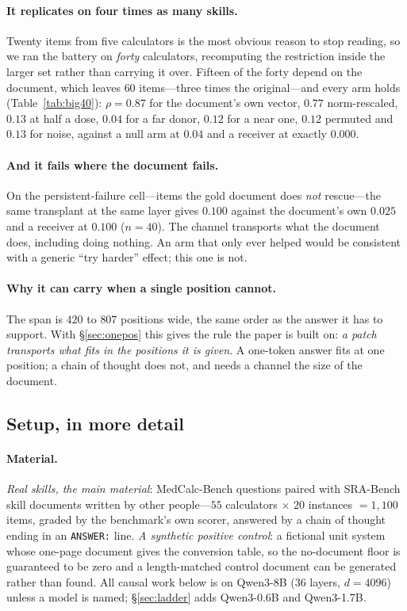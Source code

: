 \documentclass{article}
\begin{document}
\paragraph{It replicates on four times as many skills.} Twenty items from five
calculators is the most obvious reason to stop reading, so we ran the battery on
\emph{forty} calculators, recomputing the restriction inside the larger set
rather than carrying it over. Fifteen of the forty depend on the document, which
leaves $60$ items---three times the original---and every arm holds
(Table~\ref{tab:big40}): $\rho = 0.87$ for the document's own vector, $0.77$
norm-rescaled, $0.13$ at half a dose, $0.04$ for a far donor, $0.12$ for a near
one, $0.12$ permuted and $0.13$ for noise, against a null arm at $0.04$ and a
receiver at exactly $0.000$.



\paragraph{And it fails where the document fails.} On the persistent-failure
cell---items the gold document does \emph{not} rescue---the same transplant at
the same layer gives $0.100$ against the document's own $0.025$ and a receiver
at $0.100$ ($n=40$). The channel transports what the document does, including
doing nothing. An arm that only ever helped would be consistent with a generic
``try harder'' effect; this one is not.

\paragraph{Why it can carry when a single position cannot.} The span is $420$ to
$807$ positions wide, the same order as the answer it has to support. With
\S\ref{sec:onepos} this gives the rule the paper is built on: \emph{a patch
transports what fits in the positions it is given}. A one-token answer fits at
one position; a chain of thought does not, and needs a channel the size of the
document.

\subsection{Setup, in more detail}
\label{app:setup2}

\paragraph{Material.} \emph{Real skills, the main material}: MedCalc-Bench
questions paired with SRA-Bench skill documents written by other people---$55$
calculators $\times$ $20$ instances $=1{,}100$ items, graded by the benchmark's
own scorer, answered by a chain of thought ending in an \texttt{ANSWER:} line.
\emph{A synthetic positive control}: a fictional unit system whose one-page
document gives the conversion table, so the no-document floor is guaranteed to
be zero and a length-matched control document can be generated rather than
found. All causal work below is on Qwen3-8B (36 layers, $d=4096$) unless a model
is named; \S\ref{sec:ladder} adds Qwen3-0.6B and Qwen3-1.7B.
\end{document}
